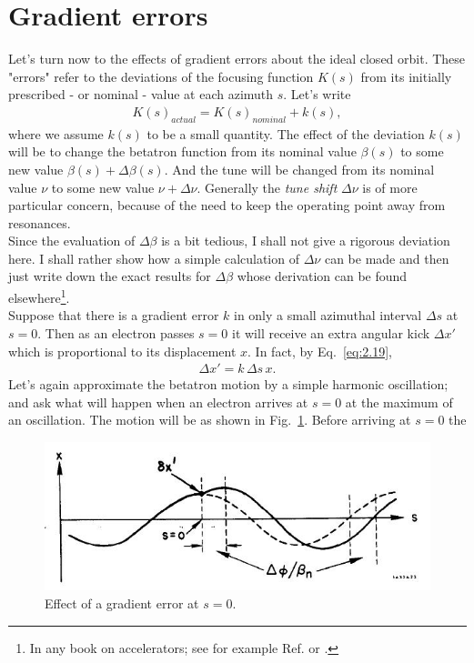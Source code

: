 \section{Gradient errors}\label{sec:2.11}

Let’s turn now to the effects of gradient errors about the ideal closed orbit. These "errors" refer to the deviations of the focusing function $K(s)$ from its initially prescribed
- or nominal - value at each azimuth $s$. Let’s write
\begin{align}
	K(s)_{actual} = K(s)_{nominal} + k(s),
\end{align}
where we assume $k(s)$ to be a small quantity. The effect of the deviation $k(s)$ will be to change the betatron function from its nominal value $\beta(s)$ to some new value $\beta(s)+\Delta\beta(s)$. And the tune will be changed from its nominal value $\nu$ to some new value $\nu + \Delta\nu$. Generally the \emph{tune shift} $\Delta\nu$ is of more particular concern, because of the need to keep the operating point away from resonances.\\
Since the evaluation of $\Delta\beta$ is a bit tedious, I shall not give a rigorous deviation
here. I shall rather show how a simple calculation of $\Delta\nu$ can be made and then just write down the exact results for $\Delta\beta$ whose derivation can be found elsewhere\footnote{In any book on accelerators; see for example Ref. \cite{5} or \cite{7}.}.\\
Suppose that there is a gradient error $k$ in only a small azimuthal interval $\Delta s$ at $s = 0$. Then as an electron passes $s = 0$ it will receive an extra angular kick $\Delta x'$ which is proportional to its displacement $x$. In fact, by Eq.~\eqref{eq:2.19},
\begin{align}\label{eq:2.96}
	\Delta x' = k\, \Delta s\, x.
\end{align}
Let’s again approximate the betatron motion by a simple harmonic oscillation; and ask what will happen when an electron arrives at $s = 0$ at the maximum of an oscillation. The motion will be as shown in Fig.~\ref{fig:fig23}. Before arriving at $s = 0$ the
\begin{figure}[!htb]
	\centering
	\includegraphics[width=0.8\linewidth]{./Figuras/fig23.jpeg}
	\caption{Effect of a gradient error at $s = 0$.}
	\label{fig:fig23}
\end{figure}
